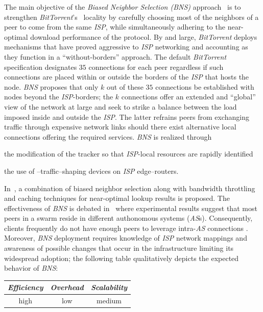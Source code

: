 The main objective of the \emph{Biased Neighbor Selection (BNS)} 
approach~\cite{BCCMSBZ2006} is to 
strengthen {\sl BitTorrent}'s~\cite{c_bittorrent_2003} locality 
by carefully choosing most of the neighbors of a peer to come from 
the same \emph{ISP}, while simultaneously adhering to the near-optimal
download performance of the protocol.
By and large, {\sl BitTorrent} deploys mechanisms that have proved
aggressive to \emph{ISP} networking and accounting as they function 
in a ``without-borders'' approach. 
The default {\sl BitTorrent} specification
designates $35$ connections for each peer regardless if such connections are
placed within or outside the borders of the \emph{ISP} that hosts the node.
\emph{BNS} proposes that only $k$ out of these $35$ connections be
established with nodes beyond the {\it ISP}-borders;
the $k$ connections offer an extended and ``global'' view of 
the network at large and seek to strike a balance between 
the load imposed inside and outside the \emph{ISP}.
The latter refrains peers from exchanging traffic through
expensive network links should there exist alternative local connections
offering the required services. 
\emph{BNS} is realized through 
\begin{inparaenum}[1)]
\item
the modification of the tracker so that 
\emph{ISP}-local resources are rapidly identified
\item
the use of \p--traffic--shaping devices on \emph{ISP} edge--routers. 
\end{inparaenum}
In~\cite{BCCMSBZ2006}, a combination of 
biased neighbor selection along with bandwidth throttling
and caching techniques for near-optimal lookup results is proposed. 
The effectiveness of \emph{BNS} is debated 
in~\cite{RTLCGZ2010} where experimental results suggest that 
most peers in a swarm reside in different authonomous systems (\emph{AS}s).
Consequently, clients frequently do not have enough peers to leverage
intra-\emph{AS} connections \cite{RTLCGZ2010}.
Moreover, \emph{BNS} deployment
requires knowledge of \emph{ISP} network mappings and awareness of possible
changes that occur in the infrastructure limiting its widespread adoption; the
following table qualitatively depicts the expected behavior of \emph{BNS}:
\begin{center}
{\footnotesize
\begin{tabular}{ccc}
\emph{Efficiency} & \emph{Overhead} & \emph{Scalability} \\
\hline
high &
low &
medium
\end{tabular}
}
\end{center}

